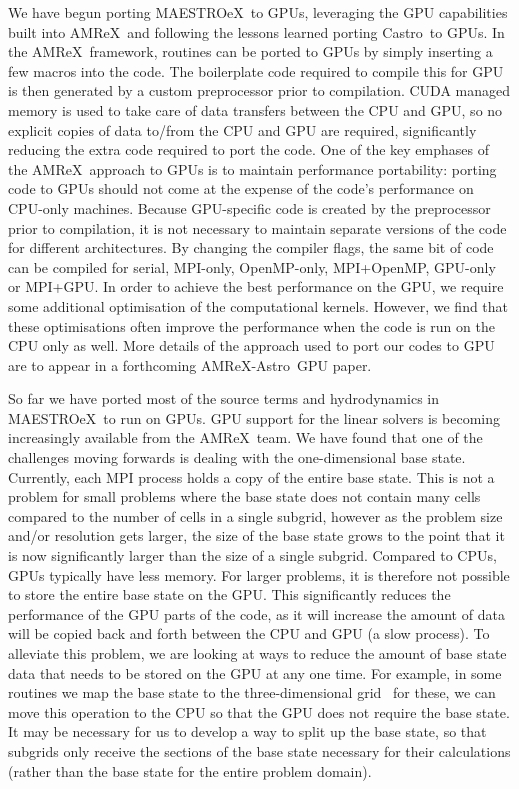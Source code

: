\documentclass[a4paper]{jpconf}
\newcommand{\maestroex}{{\sffamily MAESTROeX}}
\newcommand{\castro}{{\sffamily Castro}}
\newcommand{\amrex}{{\sffamily AMReX}}
\newcommand{\amrexastro}{{\sffamily AMReX-Astro}}
\begin{document}
We have begun porting \maestroex~to GPUs, leveraging the GPU capabilities built into \amrex~and following the lessons learned porting \castro~to GPUs. In the \amrex~framework, routines can be ported to GPUs by simply inserting a few macros into the code. The boilerplate code required to compile this for GPU is then generated by a custom preprocessor prior to compilation. CUDA managed memory is used to take care of data transfers between the CPU and GPU, so no explicit copies of data to/from the CPU and GPU are required, significantly reducing the extra code required to port the code. One of the key emphases of the \amrex~approach to GPUs is to maintain performance portability: porting code to GPUs should not come at the expense of the code's performance on CPU-only machines. Because GPU-specific code is created by the preprocessor prior to compilation, it is not necessary to maintain separate versions of the code for different architectures. By changing the compiler flags, the same bit of code can be compiled for serial, MPI-only, OpenMP-only, MPI+OpenMP, GPU-only or MPI+GPU.
In order to achieve the best performance on the GPU, we require some additional optimisation of the computational kernels. However, we find that these optimisations often improve the performance when the code is run on the CPU only as well. 
More details of the approach used to port our codes to GPU are to appear in a forthcoming \amrexastro~GPU paper. 

So far we have ported most of the source terms and hydrodynamics in \maestroex~to run on GPUs. GPU support for the linear solvers is becoming increasingly available from the \amrex~team.  We have found that one of the challenges moving forwards is dealing with the one-dimensional base state. Currently, each MPI process holds a copy of the entire base state. This is not a problem for small problems where the base state does not contain many cells compared to the number of cells in a single subgrid, however as the problem size and/or resolution gets larger, the size of the base state grows to the point that it is now significantly larger than the size of a single subgrid. Compared to CPUs, GPUs typically have less memory. For larger problems, it is therefore not possible to store the entire base state on the GPU. This significantly reduces the performance of the GPU parts of the code, as it will increase the amount of data will be copied back and forth between the CPU and GPU (a slow process). To alleviate this problem, we are looking at ways to reduce the amount of base state data that needs to be stored on the GPU at any one time. For example, in some routines we map the base state to the three-dimensional grid \textendash~for these, we can move this operation to the CPU so that the GPU does not require the base state. It may be necessary for us to develop a way to split up the base state, so that subgrids only receive the sections of the base state necessary for their calculations (rather than the base state for the entire problem domain). 
\end{document}
